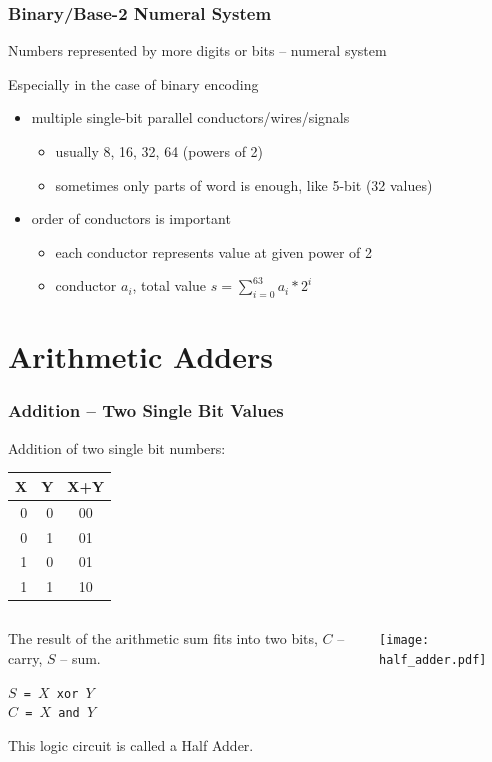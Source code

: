 \documentclass{beamer}
\begin{document}
\begin{frame}
\frametitle{Binary/Base-2 Numeral System}

Numbers represented by more digits or bits -- numeral system

Especially in the case of binary encoding

\begin{itemize}
\item multiple single-bit parallel conductors/wires/signals
\begin{itemize}
\item usually 8, 16, 32, 64 (powers of 2)
\item sometimes only parts of word is enough, like 5-bit (32 values)
\end{itemize}
\item order of conductors is important
\begin{itemize}
\item each conductor represents value at given power of 2
\item conductor $a_{i}$, total value $s = \sum_{i=0}^{63} a_{i}*2^{i}$
\end{itemize}
\end{itemize}

\end{frame}

\section{Arithmetic Adders}

\begin{frame}
\frametitle{Addition -- Two Single Bit Values}

Addition of two single bit numbers:
\begin{tabular}{|r|r|c|}\hline
X & Y & X+Y\\ \hline
0 & 0 & 00\\ \hline
0 & 1 & 01\\ \hline
1 & 0 & 01\\ \hline
1 & 1 & 10\\ \hline
\end{tabular}

\bigskip

\begin{columns}
\begin{column}{0.55\textwidth}
The result of the arithmetic sum fits into two bits, $C$ -- carry, $S$ -- sum.
\bigskip

\texttt{$S$ = $X$ xor $Y$}\\
\texttt{$C$ = $X$ and $Y$}

\bigskip

This logic circuit is called a Half Adder.
\end{column}
\begin{column}{0.45\textwidth}  
\begin{center}
   \texttt{[image: half\_adder.pdf]}
\end{center}
\end{column}
\end{columns}

\end{frame}
\end{document}
